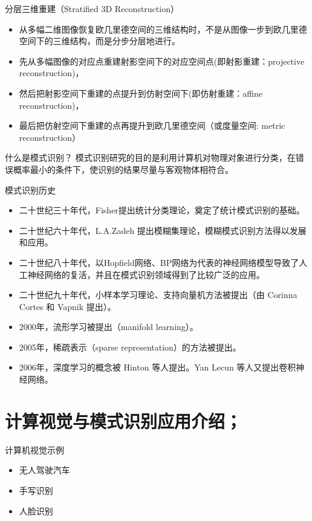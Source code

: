 \documentclass[presentation]{beamer}
\begin{document}
\begin{frame}[label={sec:org8738c66}]{分层三维重建（Stratified 3D Reconstruction）}
\begin{itemize}
\item 从多幅二维图像恢复欧几里德空间的三维结构时，不是从图像一步到欧几里德空间下的三维结构，而是分步分层地进行。
\item 先从多幅图像的对应点重建射影空间下的对应空间点(即射影重建：projective reconstruction)，
\item 然后把射影空间下重建的点提升到仿射空间下(即仿射重建：affine reconstruction)，
\item 最后把仿射空间下重建的点再提升到欧几里德空间（或度量空间: metric reconstruction）
\end{itemize}
\end{frame}

\begin{frame}[label={sec:orga074b08}]{什么是模式识别？}
模式识别研究的目的是利用计算机对物理对象进行分类，在错误概率最小的条件下，使识别的结果尽量与客观物体相符合。
\end{frame}

\begin{frame}[label={sec:org0d7648f}]{模式识别历史}
\begin{itemize}
\item 二十世纪三十年代，Fisher提出统计分类理论，奠定了统计模式识别的基础。
\item 二十世纪六十年代，L.A.Zadeh 提出模糊集理论，模糊模式识别方法得以发展和应用。
\item 二十世纪八十年代，以Hopfield网络、BP网络为代表的神经网络模型导致了人工神经网络的复活，并且在模式识别领域得到了比较广泛的应用。
\item 二十世纪九十年代，小样本学习理论、支持向量机方法被提出（由 Corinna Cortes 和 Vapnik 提出）。
\item 2000年，流形学习被提出（manifold learning）。
\item 2005年，稀疏表示（sparse representation）的方法被提出。
\item 2006年，深度学习的概念被 Hinton 等人提出。Yan Lecun 等人又提出卷积神经网络。
\end{itemize}
\end{frame}

\section{计算视觉与模式识别应用介绍；}
\label{sec:org8a33332}

\begin{frame}[label={sec:org7cbe811}]{计算机视觉示例}
\begin{itemize}
\item 无人驾驶汽车
\item 手写识别
\item 人脸识别
\end{itemize}
\end{frame}
\end{document}
